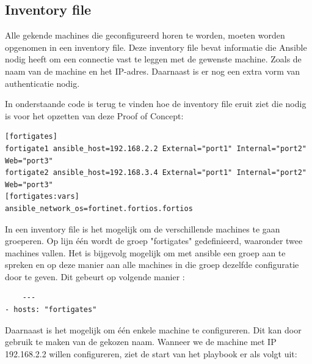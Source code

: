 \subsection{Inventory file}
Alle gekende machines die geconfigureerd horen te worden, moeten worden opgenomen in een inventory file. Deze inventory file bevat informatie die Ansible nodig heeft om een connectie vast te leggen met de gewenste machine. Zoals de naam van de machine en het IP-adres. Daarnaast is er nog een extra vorm van authenticatie nodig. 

In onderstaande code is terug te vinden hoe de inventory file eruit ziet die nodig is voor het opzetten van deze Proof of Concept: 
\begin{lstlisting}[caption={inventory file}]
[fortigates]
fortigate1 ansible_host=192.168.2.2 External="port1" Internal="port2" Web="port3"
fortigate2 ansible_host=192.168.3.4 External="port1" Internal="port2" Web="port3"
[fortigates:vars]
ansible_network_os=fortinet.fortios.fortios
\end{lstlisting}
\label{code:inventory}


In een inventory file is het mogelijk om de verschillende machines te gaan groeperen. Op lijn één wordt de groep "fortigates" gedefinieerd, waaronder twee machines vallen. Het is bijgevolg mogelijk om met ansible een groep aan te spreken en op deze manier aan alle machines in die groep dezelfde configuratie door te geven. Dit gebeurt op volgende manier :

\begin{lstlisting}
    ---
- hosts: "fortigates"
\end{lstlisting}

Daarnaast is het mogelijk om één enkele machine te configureren. Dit kan door gebruik te maken van de gekozen naam. Wanneer we de machine met IP 192.168.2.2 willen configureren, ziet de start van het playbook er als volgt uit: 

